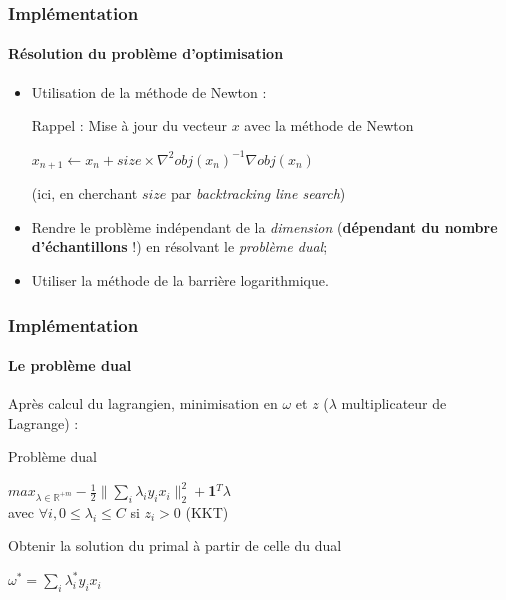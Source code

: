 \documentclass{beamer}
\begin{document}
\begin{frame}
\frametitle{Implémentation}
\framesubtitle{Résolution du problème d'optimisation}

\begin{itemize}
\item Utilisation de la méthode de Newton :

\begin{block}{Rappel : Mise à jour du vecteur $x$ avec la méthode de Newton}
          \begin{center}
          $x_{n+1} \leftarrow x_{n} + size \times \nabla^2 obj(x_n)^{-1}\nabla obj(x_n)$
          \end{center}

  (ici, en cherchant $size$ par \emph{backtracking line search})
\end{block}

\item Rendre le problème indépendant de la \emph{dimension} (\textbf{dépendant du nombre d'échantillons} !) en résolvant le \emph{problème dual};

\item Utiliser la méthode de la barrière logarithmique.

\end{itemize}

\end{frame}

\begin{frame}
\frametitle{Implémentation}
\framesubtitle{Le problème dual}

Après calcul du lagrangien, minimisation en $\omega$ et $z$ ($\lambda$ multiplicateur de Lagrange) :

\begin{block}{Problème dual}
             \begin{center}
             $max_{\lambda \in \mathbb{R}^{+m}} -\frac{1}{2}\|\sum_i\lambda_iy_ix_i\|^2_2 + $\textbf{1}$^T\lambda$\\ 
             avec $\forall i, 0 \leq \lambda_i \leq C$ si $z_i > 0$ (KKT)\\
             \end{center}
\end{block}

\begin{block}{Obtenir la solution du primal à partir de celle du dual}
             \begin{center}
               $\omega^{*} = \sum_i \lambda^{*}_i y_i x_i$
             \end{center}
\end{block}

\end{frame}
\end{document}

